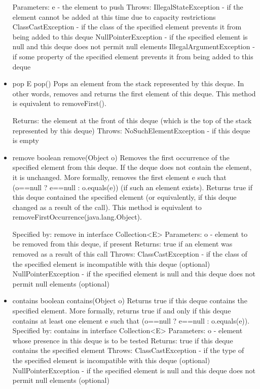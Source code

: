 \documentclass[babel]{book}
\begin{document}
\begin{itemize}
	Parameters:
	e - the element to push
	Throws:
	IllegalStateException - if the element cannot be added at this time due to capacity restrictions
	ClassCastException - if the class of the specified element prevents it from being added to this deque
	NullPointerException - if the specified element is null and this deque does not permit null elements
	IllegalArgumentException - if some property of the specified element prevents it from being added to this deque
	
	\item pop
	E pop()
	Pops an element from the stack represented by this deque. In other words, removes and returns the first element of this deque.
	This method is equivalent to removeFirst().
	
	Returns:
	the element at the front of this deque (which is the top of the stack represented by this deque)
	Throws:
	NoSuchElementException - if this deque is empty
	
	\item remove
	boolean remove(Object o)
	Removes the first occurrence of the specified element from this deque. If the deque does not contain the element, it is unchanged. More formally, removes the first element e such that (o==null ? e==null : o.equals(e)) (if such an element exists). Returns true if this deque contained the specified element (or equivalently, if this deque changed as a result of the call).
	This method is equivalent to removeFirstOccurrence(java.lang.Object).
	
	Specified by:
	remove in interface Collection<E>
	Parameters:
	o - element to be removed from this deque, if present
	Returns:
	true if an element was removed as a result of this call
	Throws:
	ClassCastException - if the class of the specified element is incompatible with this deque (optional)
	NullPointerException - if the specified element is null and this deque does not permit null elements (optional)
	
	\item contains
	boolean contains(Object o)
	Returns true if this deque contains the specified element. More formally, returns true if and only if this deque contains at least one element e such that (o==null ? e==null : o.equals(e)).
	Specified by:
	contains in interface Collection<E>
	Parameters:
	o - element whose presence in this deque is to be tested
	Returns:
	true if this deque contains the specified element
	Throws:
	ClassCastException - if the type of the specified element is incompatible with this deque (optional)
	NullPointerException - if the specified element is null and this deque does not permit null elements (optional)
	

\end{itemize}
\end{document}
